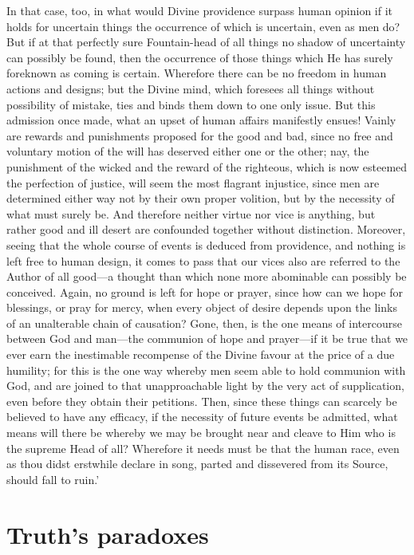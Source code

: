 \documentclass[11pt]{book}
\begin{document}
In that case, too, in what would Divine providence surpass human opinion
if it holds for uncertain things the occurrence of which is uncertain,
even as men do? But if at that perfectly sure Fountain-head of all
things no shadow of uncertainty can possibly be found, then the
occurrence of those things which He has surely foreknown as coming is
certain. Wherefore there can be no freedom in human actions and designs;
but the Divine mind, which foresees all things without possibility of
mistake, ties and binds them down to one only issue. But this admission
once made, what an upset of human affairs manifestly ensues! Vainly are
rewards and punishments proposed for the good and bad, since no free and
voluntary motion of the will has deserved either one or the other; nay,
the punishment of the wicked and the reward of the righteous, which is
now esteemed the perfection of justice, will seem the most flagrant
injustice, since men are determined either way not by their own proper
volition, but by the necessity of what must surely be. And therefore
neither virtue nor vice is anything, but rather good and ill desert are
confounded together without distinction. Moreover, seeing that the whole
course of events is deduced from providence, and nothing is left free to
human design, it comes to pass that our vices also are referred to the
Author of all good---a thought than which none more abominable can
possibly be conceived. Again, no ground is left for hope or prayer,
since how can we hope for blessings, or pray for mercy, when every
object of desire depends upon the links of an unalterable chain of
causation? Gone, then, is the one means of intercourse between God and
man---the communion of hope and prayer---if it be true that we ever earn
the inestimable recompense of the Divine favour at the price of a due
humility; for this is the one way whereby men seem able to hold
communion with God, and are joined to that unapproachable light by the
very act of supplication, even before they obtain their petitions. Then,
since these things can scarcely be believed to have any efficacy, if the
necessity of future events be admitted, what means will there be whereby
we may be brought near and cleave to Him who is the supreme Head of all?
Wherefore it needs must be that the human race, even as thou didst
erstwhile declare in song, parted and dissevered from its Source, should
fall to ruin.'




\section{Truth's paradoxes}
\end{document}
